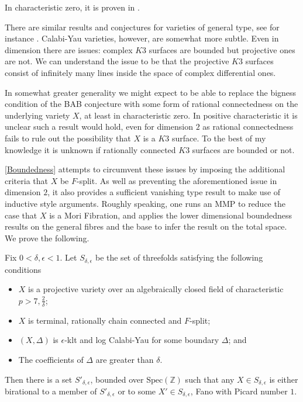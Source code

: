 \documentclass[a4paper,12pt]{book}
\begin{document}
	In characteristic zero, it is proven in \cite[Theorem 1.1]{birkar2016singularities}.
	
	There are similar results and conjectures for varieties of general type, see for instance \cite{HMX18}. Calabi-Yau varieties, however, are somewhat more subtle. Even in dimension there are issues: complex $K3$ surfaces are bounded but projective ones are not. We can understand the issue to be that the projective $K3$ surfaces consist of infinitely many lines inside the space of complex differential ones.
	
	In somewhat greater generality we might expect to be able to replace the bigness condition of the BAB conjecture with some form of rational connectedness on the underlying variety $X$, at least in characteristic zero. In positive characteristic it is unclear such a result would hold, even for dimension $2$ as rational connectedness fails to rule out the possibility that $X$ is a $K3$ surface. To the best of my knowledge it is unknown if rationally connected $K3$ surfaces are bounded or not.
	
	\autoref{Boundedness} attempts to circumvent these issues by imposing the additional criteria that $X$ be $F$-split. As well as preventing the aforementioned issue in dimension $2$, it also provides a sufficient vanishing type result to make use of inductive style arguments. Roughly speaking, one runs an MMP to reduce the case that $X$ is a Mori Fibration, and applies the lower dimensional boundedness results on the general fibres and the base to infer the result on the total space. We prove the following.
	
	\begin{theo}\label{Main_Bound}
		Fix $0 < \delta, \epsilon <1$. Let $S_{\delta,\epsilon}$ be the set of threefolds satisfying the following conditions
		\begin{itemize}
			\item $X$ is a projective variety over an algebraically closed field of characteristic $p >7, \frac{2}{\delta}$;
			\item $X$ is terminal, rationally chain connected and $F$-split;
			\item $(X,\Delta)$ is $\epsilon$-klt and log Calabi-Yau for some boundary $\Delta$; and
			\item The coefficients of $\Delta$ are greater than $\delta$.
		\end{itemize}
		
		Then there is a set $S'_{\delta,\epsilon}$, bounded over $\text{Spec}(\mathbb{Z})$ such that any $X\in S_{\delta,\epsilon}$ is either birational to a member of $S'_{\delta,\epsilon}$ or to some $X'\in S_{\delta,\epsilon}$, Fano with Picard number $1$. 
	\end{theo}
	
\end{document}
